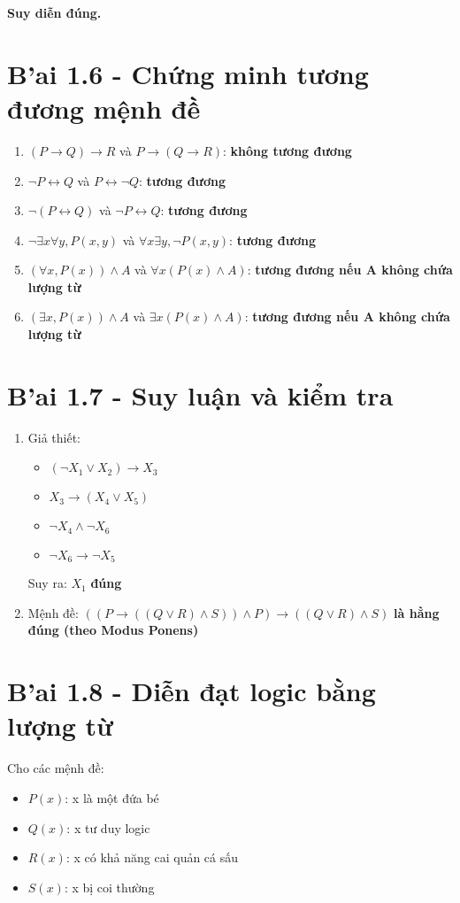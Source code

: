 \documentclass[12pt]{article}
\begin{document}
\textbf{Suy diễn đúng.}

\section*{B'ai 1.6 - Chứng minh tương đương mệnh đề}
\begin{enumerate}[label=\alph*)]
\item $(P \rightarrow Q) \rightarrow R$ và $P \rightarrow (Q \rightarrow R)$: \textbf{không tương đương}
\item $\neg P \leftrightarrow Q$ và $P \leftrightarrow \neg Q$: \textbf{tương đương}
\item $\neg(P \leftrightarrow Q)$ và $\neg P \leftrightarrow Q$: \textbf{tương đương}
\item $\neg\exists x\forall y, P(x, y)$ và $\forall x\exists y, \neg P(x, y)$: \textbf{tương đương}
\item $(\forall x, P(x)) \land A$ và $\forall x (P(x) \land A)$: \textbf{tương đương nếu A không chứa lượng từ}
\item $(\exists x, P(x)) \land A$ và $\exists x (P(x) \land A)$: \textbf{tương đương nếu A không chứa lượng từ}
\end{enumerate}

\section*{B'ai 1.7 - Suy luận và kiểm tra}
\begin{enumerate}[label=\alph*)]
\item Giả thiết:
\begin{itemize}
\item $(\neg X_1 \lor X_2) \rightarrow X_3$
\item $X_3 \rightarrow (X_4 \lor X_5)$
\item $\neg X_4 \land \neg X_6$
\item $\neg X_6 \rightarrow \neg X_5$
\end{itemize}
Suy ra: $X_1$ \textbf{đúng}

\item Mệnh đề: $((P \rightarrow ((Q \lor R) \land S)) \land P) \rightarrow ((Q \lor R) \land S)$\textbf{ là hằng đúng (theo Modus Ponens)}
\end{enumerate}

\section*{B'ai 1.8 - Diễn đạt logic bằng lượng từ}
Cho các mệnh đề:
\begin{itemize}
\item $P(x)$: x là một đứa bé
\item $Q(x)$: x tư duy logic
\item $R(x)$: x có khả năng cai quản cá sấu
\item $S(x)$: x bị coi thường
\end{itemize}
\end{document}
